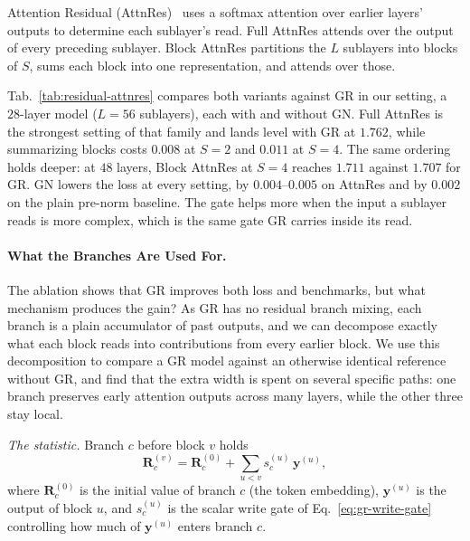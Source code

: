 Attention Residual
(AttnRes)~\citep{kimiteam2026attentionresiduals} uses a softmax attention over earlier layers' outputs to determine each sublayer's read. Full AttnRes attends over the output of every preceding sublayer. 
Block AttnRes partitions the $L$
sublayers into blocks of $S$, sums each block into one representation, and attends over those.

Tab.~\ref{tab:residual-attnres} compares both variants against GR in our setting, a $28$-layer model ($L=56$ sublayers), each with and without GN. 
Full AttnRes is the strongest setting of that family and lands level with GR at $1.762$, while summarizing blocks costs $0.008$ at $S=2$ and $0.011$ at $S=4$. 
The same ordering holds deeper: at $48$ layers, Block
AttnRes at $S=4$ reaches $1.711$ against $1.707$ for GR.
GN lowers the loss at every setting, by $0.004$--$0.005$ on AttnRes and by $0.002$ on the plain pre-norm baseline. 
The gate helps more when the input a sublayer reads is more complex, which is the same gate GR carries inside its read.




\paragraph{What the Branches Are Used For.}
\label{sec:residual-analysis}
The ablation shows that GR improves both loss and benchmarks, but what mechanism produces the gain? 
As GR has no residual branch mixing, each branch is
a plain accumulator of past outputs, and we can decompose exactly what each block reads into contributions from every earlier block. 
We use this decomposition to compare a GR model against an otherwise identical reference without GR, and find that the extra width is spent on several specific paths: one branch preserves early attention outputs across many layers, while the other three stay local.

\emph{The statistic.}
Branch $c$ before block $v$ holds
\begin{equation}
\bm{R}^{(v)}_c = \bm{R}^{(0)}_c + \sum_{u<v} s^{(u)}_c\,\bm{y}^{(u)},
\label{eq:gr-accumulator}
\end{equation}
where $\bm{R}^{(0)}_c$ is the initial value of branch $c$ (the token
embedding), $\bm{y}^{(u)}$ is the output of block $u$, and $s^{(u)}_c$ is
the scalar write gate of Eq.~\eqref{eq:gr-write-gate} controlling how much
of $\bm{y}^{(u)}$ enters branch $c$.

